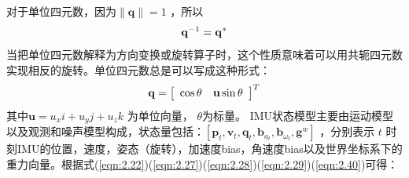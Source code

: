 对于单位四元数，因为$\|\mathbf{q}\|=1 $ ，所以
\begin{equation}
\label{eqn:2.39}
\setlength{\abovedisplayskip}{6pt}
\setlength{\belowdisplayskip}{6pt}
\mathbf{q}^{-1}=\mathbf{q}^{*}
\end{equation}
当把单位四元数解释为方向变换或旋转算子时，这个性质意味着可以用共轭四元数实现相反的旋转。单位四元数总是可以写成这种形式：
\begin{equation}
\label{eqn:2.40}
\setlength{\abovedisplayskip}{6pt}
\setlength{\belowdisplayskip}{6pt}
\mathbf{q}=\left[ \begin{array}{cc}{\cos \theta} & {\mathbf{u} \sin \theta}\end{array}\right]^T
\end{equation}
其中$\mathbf{u}=u_{x} i+u_{y} j+u_{z} k $ 为单位向量， $\theta $为标量。
IMU状态模型主要由运动模型以及观测和噪声模型构成，状态量包括：$[\mathbf{p}_t, \mathbf{v}_t, \mathbf{q}_t, \mathbf{b}_{a_t}, \bm{b}_{\omega_t},\mathbf{g}^w]$
 ，分别表示 $t$  时刻IMU的位置，速度，姿态（旋转），加速度bias，角速度bias以及世界坐标系下的重力向量。根据式(\ref{eqn:2.22})(\ref{eqn:2.27})(\ref{eqn:2.28})(\ref{eqn:2.29})(\ref{eqn:2.40})可得：
